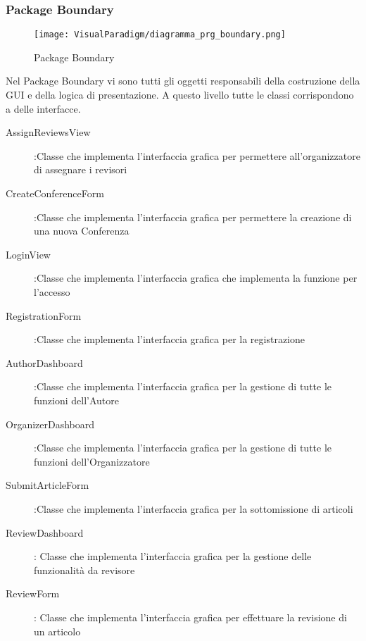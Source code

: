\subsubsection{Package Boundary}

\label{fig:package_boundary_prg_image}

\begin{figure}[ht]
  \centering
  \texttt{[image: VisualParadigm/diagramma\_prg\_boundary.png]}
  \caption{Package Boundary}
  \label{fig:Package Boundary}
\end{figure}

Nel Package Boundary vi sono tutti gli oggetti responsabili della costruzione della GUI e della logica di presentazione. A questo livello tutte le classi corrispondono a delle interfacce. 

\begin{description}
\item[AssignReviewsView] :Classe che implementa l'interfaccia grafica per permettere all'organizzatore di assegnare i revisori
\item[CreateConferenceForm] :Classe che implementa l'interfaccia grafica per permettere la creazione di una nuova Conferenza
\item[LoginView] :Classe che implementa l'interfaccia grafica che implementa la funzione per l'accesso
\item[RegistrationForm] :Classe che implementa l'interfaccia grafica per la registrazione
\item[AuthorDashboard] :Classe che implementa l'interfaccia grafica per la gestione di tutte le funzioni dell'Autore
\item[OrganizerDashboard] :Classe che implementa l'interfaccia grafica per la gestione di tutte le funzioni dell'Organizzatore
\item[SubmitArticleForm] :Classe che implementa l'interfaccia grafica per la sottomissione di articoli
\item[ReviewDashboard] : Classe che implementa l'interfaccia grafica per la gestione delle funzionalità da revisore
\item[ReviewForm]: Classe che implementa l'interfaccia grafica per effettuare la revisione di un articolo
\end{description}


